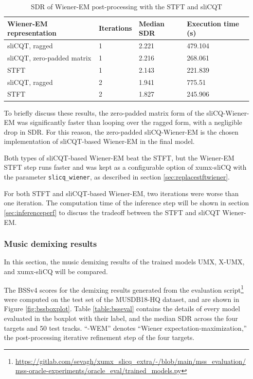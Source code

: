 \documentclass[report.tex]{subfiles}
\begin{document}
\begin{table}[ht]
	\centering
	\caption{SDR of Wiener-EM post-processing with the STFT and sliCQT}
	\label{table:wienerem}
	\begin{tabular}{ |l|l|l|l| }
	 \hline
		Wiener-EM representation & Iterations & Median SDR & Execution time (s) \\
	 \hline
	 \hline
		sliCQT, ragged & 1 & 2.221 & 479.104 \\
	 \hline
		sliCQT, zero-padded matrix & 1 & 2.216 & 268.061  \\
	 \hline
		STFT & 1 & 2.143 & 221.839  \\
	 \hline
		sliCQT, ragged & 2 & 1.941 & 775.51  \\
	 \hline
		STFT & 2 & 1.827 & 245.906  \\
	 \hline
\end{tabular}
\end{table}

To briefly discuss these results, the zero-padded matrix form of the sliCQ-Wiener-EM was significantly faster than looping over the ragged form, with a negligible drop in SDR. For this reason, the zero-padded sliCQ-Wiener-EM is the chosen implementation of sliCQT-based Wiener-EM in the final model.

Both types of sliCQT-based Wiener-EM beat the STFT, but the Wiener-EM STFT step runs faster and was kept as a configurable option of xumx-sliCQ with the parameter \Verb#slicq_wiener#, as described in section \ref{sec:replacestftwiener}.

For both STFT and sliCQT-based Wiener-EM, two iterations were worse than one iteration. The computation time of the inference step will be shown in section \ref{sec:inferenceperf} to discuss the tradeoff between the STFT and sliCQT Wiener-EM.

\subsubsection{Music demixing results}
\label{sec:demixresults}

In this section, the music demixing results of the trained models UMX, X-UMX, and xumx-sliCQ will be compared.

The BSSv4 scores for the demixing results generated from the evaluation script\footnote{\url{https://gitlab.com/sevagh/xumx_slicq_extra/-/blob/main/mss_evaluation/mss-oracle-experiments/oracle_eval/trained_models.py}} were computed on the test set of the MUSDB18-HQ dataset, and are shown in Figure \ref{fig:bssboxplot}. Table \ref{table:bsseval} contains the details of every model evaluated in the boxplot with their label, and the median SDR across the four targets and 50 test tracks. ``-WEM'' denotes ``Wiener expectation-maximization,'' the post-processing iterative refinement step of the four targets.
\end{document}

